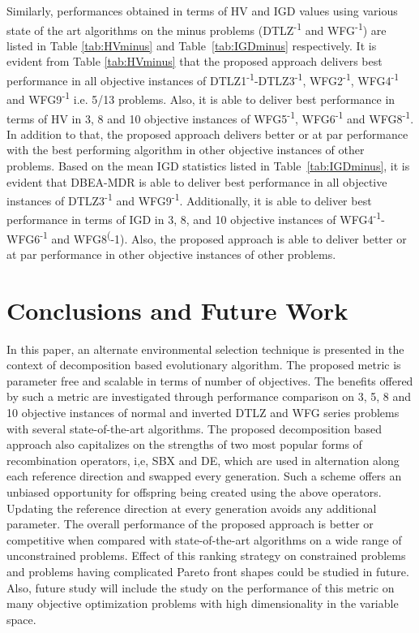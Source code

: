 \documentclass{sig-alternate}
\begin{document}
Similarly, performances obtained in terms of HV and IGD values using various state of the art algorithms on the minus problems (DTLZ\textsuperscript{-1} and WFG\textsuperscript{-1}) are listed in Table \ref{tab:HVminus} and Table~\ref{tab:IGDminus} respectively. It is evident from Table \ref{tab:HVminus} that the proposed approach delivers best performance in all objective instances of DTLZ1\textsuperscript{-1}-DTLZ3\textsuperscript{-1}, WFG2\textsuperscript{-1}, WFG4\textsuperscript{-1} and WFG9\textsuperscript{-1} i.e. 5/13 problems. Also, it is able to deliver best performance in terms of HV in 3, 8 and 10 objective instances of WFG5\textsuperscript{-1}, WFG6\textsuperscript{-1} and WFG8\textsuperscript{-1}. In addition to that, the proposed approach delivers better or at par performance with the best performing algorithm in other objective instances of other problems. Based on the mean IGD statistics listed in Table~\ref{tab:IGDminus}, it is evident that DBEA-MDR is able to deliver best performance in all objective instances of DTLZ3\textsuperscript{-1} and WFG9\textsuperscript{-1}. Additionally, it is able to deliver best performance in terms of IGD in 3, 8, and 10 objective instances of WFG4\textsuperscript{-1}-WFG6\textsuperscript{-1} and WFG8\textsuperscript(-1). Also, the proposed approach is able to deliver better or at par performance in other objective instances of other problems.

\section{Conclusions and Future Work}
\label{sec:conc}
In this paper, an alternate environmental selection technique is presented in the context of decomposition based evolutionary algorithm. The proposed metric is parameter free and scalable in terms of number of objectives. The benefits offered by such a metric are investigated through performance comparison on 3, 5, 8 and 10 objective instances of normal and inverted DTLZ and WFG series problems with several state-of-the-art algorithms. The proposed decomposition based approach also capitalizes on the strengths of two most popular forms of recombination operators, i,e, SBX and DE, which are used in alternation along each reference direction and swapped every generation. Such a scheme offers an unbiased opportunity for offspring being created using the above operators. Updating the reference direction at every generation avoids any additional parameter. The overall performance of the proposed approach is better or competitive when compared with state-of-the-art algorithms on a wide range of unconstrained problems. Effect of this ranking strategy on constrained problems and problems having complicated Pareto front shapes could be studied in future. Also, future study will include the study on the performance of this metric on many objective optimization problems with high dimensionality in the variable space.


\small{}
\balance
\end{document}
